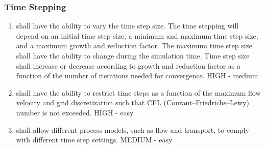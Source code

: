 \subsubsection{Time Stepping}
\begin{enumerate}[resume]
	\item \label{NMvarTS} \pft shall have the ability to vary the time step size. 
	The time stepping will depend on an initial time step size, a minimum and maximum time step size, and a maximum growth and reduction factor. 
	The maximum time step size shall have the ability to change during the simulation time. 
	Time step size shall increase or decrease according to growth and reduction factor as a function of the number of iterations needed for convergence. HIGH - medium
	\item \label{TSbyCFL} \pft shall have the ability to restrict time steps as a function of the maximum flow velocity and grid discretization such that CFL (Courant–Friedrichs–Lewy) number is not exceeded. HIGH - easy
	\item \label{TSbyModel} \pft shall allow different process models, such as flow and transport, to comply with different time step settings. MEDIUM - easy
\end{enumerate}


